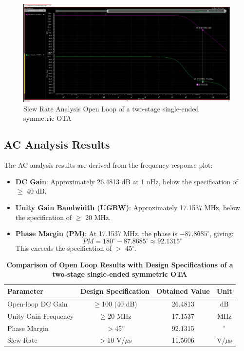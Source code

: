     \begin{figure}[h]
        \centering
           \includegraphics[width=1\textwidth]{images/two_stage_ota_open_ac.png}
        \caption{Slew Rate Analysis Open Loop of a two-stage single-ended symmetric OTA }
        \label{fig: }
    \end{figure}
\newpage
\subsection{AC Analysis Results}
The AC analysis results are derived from the frequency response plot:

\begin{itemize}
    \item \textbf{DC Gain}: Approximately 26.4813 dB at 1 nHz, below the specification of $\geq$ 40 dB.
    \item \textbf{Unity Gain Bandwidth (UGBW)}: Approximately 17.1537 MHz, below the specification of $\geq$ 20 MHz.
    \item \textbf{Phase Margin (PM)}: At 17.1537 MHz, the phase is $-87.8685^\circ$, giving:
    \begin{equation}
        PM = 180^\circ - 87.8685^\circ \approx 92.1315^\circ
    \end{equation}
    This exceeds the specification of $>$ 45$^\circ$.
\end{itemize}

\begin{table}[h]
    \centering
    \captionsetup{justification=centering} %
    \caption*{\textbf{Comparison of Open Loop Results with Design Specifications of a two-stage single-ended symmetric OTA }} %
    \begin{tabular}{l c c c}
        \toprule
        \textbf{Parameter} & \textbf{Design Specification} & \textbf{Obtained Value} & \textbf{Unit} \\
        \midrule
        Open-loop DC Gain & $\geq$100 (40 dB) & 26.4813 & dB \\
        Unity Gain Frequency & $\geq$20 MHz & 17.1537 & MHz \\
        Phase Margin & $>$45$^\circ$ & 92.1315 & $^\circ$ \\
        Slew Rate & $>$10 V/$\mu$s & 11.5606 & V/$\mu$s \\
        \bottomrule
    \end{tabular}
\end{table}


